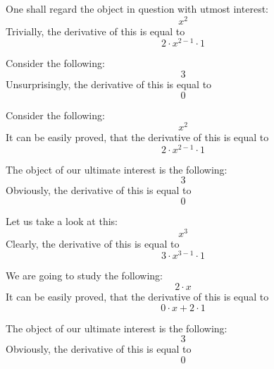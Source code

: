\documentclass{article}
\begin{document}
One shall regard the object in question with utmost interest:
\begin{equation}
x ^{2 } 
\end{equation}
Trivially, the derivative of this is equal to
\begin{equation}
2 \cdot x ^{2 - 1 } \cdot 1 
\end{equation}

Consider the following:
\begin{equation}
3 
\end{equation}
Unsurprisingly, the derivative of this is equal to
\begin{equation}
0 
\end{equation}

Consider the following:
\begin{equation}
x ^{2 } 
\end{equation}
It can be easily proved, that the derivative of this is equal to
\begin{equation}
2 \cdot x ^{2 - 1 } \cdot 1 
\end{equation}

The object of our ultimate interest is the following:
\begin{equation}
3 
\end{equation}
Obviously, the derivative of this is equal to
\begin{equation}
0 
\end{equation}

Let us take a look at this:
\begin{equation}
x ^{3 } 
\end{equation}
Clearly, the derivative of this is equal to
\begin{equation}
3 \cdot x ^{3 - 1 } \cdot 1 
\end{equation}

We are going to study the following:
\begin{equation}
2 \cdot x 
\end{equation}
It can be easily proved, that the derivative of this is equal to
\begin{equation}
0 \cdot x + 2 \cdot 1 
\end{equation}

The object of our ultimate interest is the following:
\begin{equation}
3 
\end{equation}
Obviously, the derivative of this is equal to
\begin{equation}
0 
\end{equation}
\end{document}
